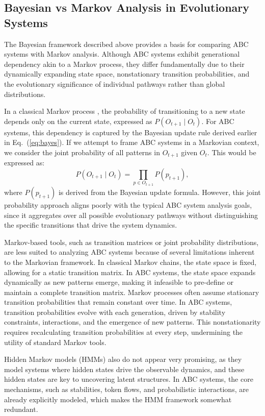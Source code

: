 \documentclass[entropy,article,submit,pdftex,oneauthor]{Definitions/mdpi}
\begin{document}
\subsection{Bayesian vs Markov Analysis in Evolutionary Systems}

The Bayesian framework described above provides a basis for comparing ABC systems with Markov analysis. Although ABC systems exhibit generational dependency akin to a Markov process, they differ fundamentally due to their dynamically expanding state space, nonstationary transition probabilities, and the evolutionary significance of individual pathways rather than global distributions. 

In a classical Markov process \cite{norris1997markov}, the probability of transitioning to a new state depends only on the current state, expressed as \( P(O_{t+1} \mid O_t) \). For ABC systems, this dependency is captured by the Bayesian update rule derived earlier in Eq.~(\ref{eq:bayes}). If we attempt to frame ABC systems in a Markovian context, we consider the joint probability of all patterns in \( O_{t+1} \) given \( O_t \). This would be expressed as:
\begin{equation}
P(O_{t+1} \mid O_t) = \prod_{p \in O_{t+1}} P(p_{t+1}),
\end{equation}
where \( P(p_{t+1}) \) is derived from the Bayesian update formula. However, this joint probability approach aligns poorly with the typical ABC system analysis goals, since it aggregates over all possible evolutionary pathways without distinguishing the specific transitions that drive the system dynamics.

Markov-based tools, such as transition matrices or joint probability distributions, are less suited to analyzing ABC systems because of several limitations inherent to the Markovian framework. In classical Markov chains, the state space is fixed, allowing for a static transition matrix. In ABC systems, the state space expands dynamically as new patterns emerge, making it infeasible to pre-define or maintain a complete transition matrix. Markov processes often assume stationary transition probabilities that remain constant over time. In ABC systems, transition probabilities evolve with each generation, driven by stability constraints, interactions, and the emergence of new patterns. This nonstationarity requires recalculating transition probabilities at every step, undermining the utility of standard Markov tools.

Hidden Markov models (HMMs) \cite{rabiner1989hmm} also do not appear very promising, as they model systems where hidden states drive the observable dynamics, and these hidden states are key to uncovering latent structures. In ABC systems, the core mechanisms, such as stabilities, token flows, and probabilistic interactions, are already explicitly modeled, which makes the HMM framework somewhat redundant.
\end{document}
